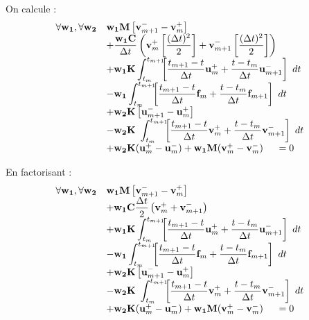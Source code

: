 \documentclass[12pt,a4paper]{report}
\begin{document}
On calcule :
\begin{equation}
\begin{array}{r l}
	\forall \mathbf{w_1},\forall \mathbf{w_2}
	&\displaystyle
	 \mathbf{w_1} \mathbf{M}
		\left[ \mathbf{v}_{m+1}^- - \mathbf{v}_m^+ \right]
	\\ 
	  &\displaystyle
	  +\frac{\mathbf{w_1} \mathbf{C}}{\Delta t}
	     \left(
	  		\mathbf{v}_m^+ 
				\left[ \frac{(\Delta t)^2}{2} \right]
			+ \mathbf{v}_{m+1}^-
				\left[ \frac{(\Delta t)^2}{2} \right]
		 \right)
	\\
	  &\displaystyle
	 +\mathbf{w_1} \mathbf{K}\int_{t_m}^{t_{m+1}} \!\!\! 	
		\left[
			\frac{t_{m+1}-t}{\Delta t} \mathbf{u}_m^+ + 
			\frac{t-t_m}{\Delta t} \mathbf{u}_{m+1}^- 
			\right] ~dt
	\\
	  &\displaystyle
	   -\mathbf{w_1} \int_{t_m}^{t_{m+1}} \!\!\!
		\left[
			\frac{t_{m+1}-t}{\Delta t} \mathbf{f}_m + 
			\frac{t-t_m}{\Delta t} \mathbf{f}_{m+1}
			\right] ~dt
	\\
	  &+\displaystyle
	    \mathbf{w_2} \mathbf{K}
		\left[ \mathbf{u}_{m+1}^- - \mathbf{u}_m^+ \right]
	\\
	  &\displaystyle	    
	    -\mathbf{w_2} \mathbf{K}~\int_{t_m}^{t_{m+1}} \!\!\! 	
		\left[
			\frac{t_{m+1}-t}{\Delta t} \mathbf{v}_m^+ + 
			\frac{t-t_m}{\Delta t} \mathbf{v}_{m+1}^- 
			\right] ~dt
	\\
	  &+ \mathbf{w_2} \mathbf{K} (\mathbf{u}_m^+ - \mathbf{u}_m^-)
	   +  \mathbf{w_1} \mathbf{M}(\mathbf{v}_m^+ - \mathbf{v}_m^-)
	~~~~=0
\end{array}
\end{equation}

En factorisant :
\begin{equation}
\begin{array}{r l}
	\forall \mathbf{w_1},\forall \mathbf{w_2}
	&\displaystyle
	 \mathbf{w_1} \mathbf{M}
		\left[ \mathbf{v}_{m+1}^- - \mathbf{v}_m^+ \right]
	\\ 
	  &\displaystyle
	  +\mathbf{w_1} \mathbf{C} \frac{\Delta t}{2}
	     \left(
	  		\mathbf{v}_m^+ + \mathbf{v}_{m+1}^-
		 \right)
	\\
	  &\displaystyle
	 +\mathbf{w_1} \mathbf{K}\int_{t_m}^{t_{m+1}} \!\!\! 	
		\left[
			\frac{t_{m+1}-t}{\Delta t} \mathbf{u}_m^+ + 
			\frac{t-t_m}{\Delta t} \mathbf{u}_{m+1}^- 
			\right] ~dt
	\\
	  &\displaystyle
	   -\mathbf{w_1} \int_{t_m}^{t_{m+1}} \!\!\!
		\left[
			\frac{t_{m+1}-t}{\Delta t} \mathbf{f}_m + 
			\frac{t-t_m}{\Delta t} \mathbf{f}_{m+1}
			\right] ~dt
	\\
	  &+\displaystyle
	    \mathbf{w_2} \mathbf{K}
		\left[ \mathbf{u}_{m+1}^- - \mathbf{u}_m^+ \right]
	\\
	  &\displaystyle	    
	    -\mathbf{w_2} \mathbf{K}~\int_{t_m}^{t_{m+1}} \!\!\! 	
		\left[
			\frac{t_{m+1}-t}{\Delta t} \mathbf{v}_m^+ + 
			\frac{t-t_m}{\Delta t} \mathbf{v}_{m+1}^- 
			\right] ~dt
	\\
	  &+ \mathbf{w_2} \mathbf{K} (\mathbf{u}_m^+ - \mathbf{u}_m^-)
	   +  \mathbf{w_1} \mathbf{M}(\mathbf{v}_m^+ - \mathbf{v}_m^-)
	~~~~=0
\end{array}
\end{equation}
\end{document}
